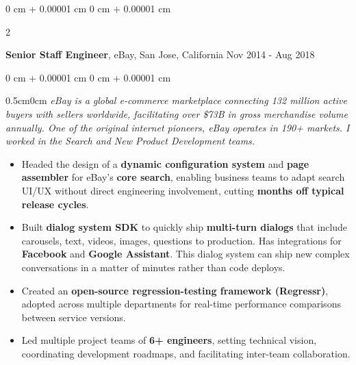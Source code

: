 \documentclass[10pt, letterpaper]{article}
\newenvironment{highlights}{
    \begin{itemize}[
        topsep=0.10 cm,
        parsep=0.10 cm,
        partopsep=0pt,
        itemsep=0pt,
        leftmargin=0 cm + 10pt
    ]
}{
    \end{itemize}
} %
\newenvironment{onecolentry}{
    \begin{adjustwidth}{
        0 cm + 0.00001 cm
    }{
        0 cm + 0.00001 cm
    }
}{
    \end{adjustwidth}
} %
\newenvironment{twocolentry}[2][]{
    \onecolentry
    \def\secondColumn{#2}
    \setcolumnwidth{\fill, 4.5 cm}
    \begin{paracol}{2}
}{
    \switchcolumn \raggedleft \secondColumn
    \end{paracol}
    \endonecolentry
} %
\begin{document}
        \vspace{0.15 cm}
        \begin{twocolentry}{
            Nov 2014 - Aug 2018
        }
            \textbf{Senior Staff Engineer}, eBay, San Jose, California\end{twocolentry}
        \vspace{0.10 cm}
        \begin{onecolentry}
            \begin{adjustwidth}{0.5cm}{0cm}
            \textit{eBay is a global e-commerce marketplace connecting 132 million active buyers with sellers worldwide, facilitating over \$73B in gross merchandise volume annually. One of the original internet pioneers, eBay operates in 190+ markets. I worked in the Search and New Product Development teams.}
            \end{adjustwidth}

            \vspace{0.10 cm}
            \begin{highlights}
                \item Headed the design of a \textbf{dynamic configuration system} and \textbf{page assembler} for eBay's \textbf{core search}, enabling business teams to adapt search UI/UX without direct engineering involvement, cutting \textbf{months off typical release cycles}.
                \item Built \textbf{dialog system SDK} to quickly ship \textbf{multi-turn dialogs} that include carousels, text, videos, images, questions to production. Has integrations for \textbf{Facebook} and \textbf{Google Assistant}. This dialog system can ship new complex conversations in a matter of minutes rather than code deploys.
                \item Created an \textbf{open-source regression-testing framework (Regressr)}, adopted across multiple departments for real-time performance comparisons between service versions.
                \item Led multiple project teams of \textbf{6+ engineers}, setting technical vision, coordinating development roadmaps, and facilitating inter-team collaboration.
            \end{highlights}
        \end{onecolentry}
\end{document}
